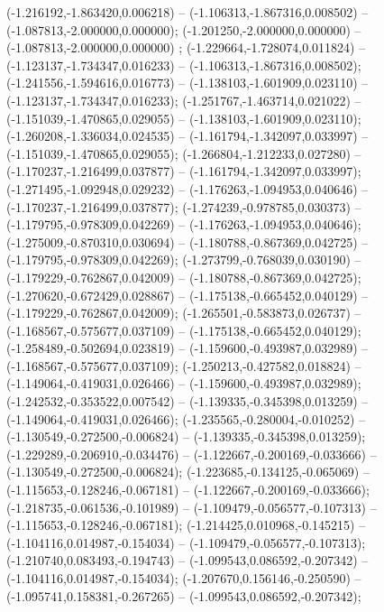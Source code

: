  (-1.216192,-1.863420,0.006218) -- (-1.106313,-1.867316,0.008502) -- (-1.087813,-2.000000,0.000000);
 (-1.201250,-2.000000,0.000000) -- (-1.087813,-2.000000,0.000000) ;
 (-1.229664,-1.728074,0.011824) -- (-1.123137,-1.734347,0.016233) -- (-1.106313,-1.867316,0.008502);
 (-1.241556,-1.594616,0.016773) -- (-1.138103,-1.601909,0.023110) -- (-1.123137,-1.734347,0.016233);
 (-1.251767,-1.463714,0.021022) -- (-1.151039,-1.470865,0.029055) -- (-1.138103,-1.601909,0.023110);
 (-1.260208,-1.336034,0.024535) -- (-1.161794,-1.342097,0.033997) -- (-1.151039,-1.470865,0.029055);
 (-1.266804,-1.212233,0.027280) -- (-1.170237,-1.216499,0.037877) -- (-1.161794,-1.342097,0.033997);
 (-1.271495,-1.092948,0.029232) -- (-1.176263,-1.094953,0.040646) -- (-1.170237,-1.216499,0.037877);
 (-1.274239,-0.978785,0.030373) -- (-1.179795,-0.978309,0.042269) -- (-1.176263,-1.094953,0.040646);
 (-1.275009,-0.870310,0.030694) -- (-1.180788,-0.867369,0.042725) -- (-1.179795,-0.978309,0.042269);
 (-1.273799,-0.768039,0.030190) -- (-1.179229,-0.762867,0.042009) -- (-1.180788,-0.867369,0.042725);
 (-1.270620,-0.672429,0.028867) -- (-1.175138,-0.665452,0.040129) -- (-1.179229,-0.762867,0.042009);
 (-1.265501,-0.583873,0.026737) -- (-1.168567,-0.575677,0.037109) -- (-1.175138,-0.665452,0.040129);
 (-1.258489,-0.502694,0.023819) -- (-1.159600,-0.493987,0.032989) -- (-1.168567,-0.575677,0.037109);
 (-1.250213,-0.427582,0.018824) -- (-1.149064,-0.419031,0.026466) -- (-1.159600,-0.493987,0.032989);
 (-1.242532,-0.353522,0.007542) -- (-1.139335,-0.345398,0.013259) -- (-1.149064,-0.419031,0.026466);
 (-1.235565,-0.280004,-0.010252) -- (-1.130549,-0.272500,-0.006824) -- (-1.139335,-0.345398,0.013259);
 (-1.229289,-0.206910,-0.034476) -- (-1.122667,-0.200169,-0.033666) -- (-1.130549,-0.272500,-0.006824);
 (-1.223685,-0.134125,-0.065069) -- (-1.115653,-0.128246,-0.067181) -- (-1.122667,-0.200169,-0.033666);
 (-1.218735,-0.061536,-0.101989) -- (-1.109479,-0.056577,-0.107313) -- (-1.115653,-0.128246,-0.067181);
 (-1.214425,0.010968,-0.145215) -- (-1.104116,0.014987,-0.154034) -- (-1.109479,-0.056577,-0.107313);
 (-1.210740,0.083493,-0.194743) -- (-1.099543,0.086592,-0.207342) -- (-1.104116,0.014987,-0.154034);
 (-1.207670,0.156146,-0.250590) -- (-1.095741,0.158381,-0.267265) -- (-1.099543,0.086592,-0.207342);
